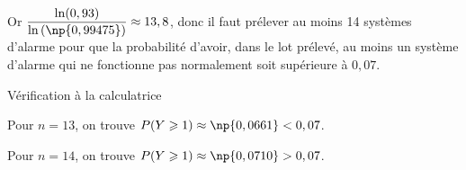 Or $\dfrac{\ln(0,93)}{\ln \left (\np{0,99475}\right )} \approx 13,8$, donc il faut prélever au moins 14 systèmes d'alarme pour que la probabilité d'avoir, dans le lot prélevé, au moins un système d'alarme qui ne fonctionne pas normalement soit supérieure à $0,07$.


\begin{list}{\textbullet}{Vérification à la calculatrice}
\item Pour $n=13$, on trouve $P(Y\geqslant 1) \approx \np{0,0661}<0,07$.
\item Pour $n=14$, on trouve $P(Y\geqslant 1) \approx \np{0,0710}>0,07$.
\end{list}

\vspace{0.5cm}

